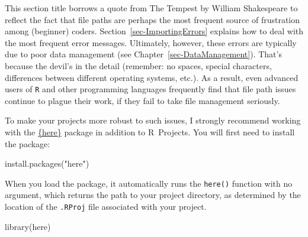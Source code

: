 \documentclass[
  letterpaper,
  DIV=11,
  numbers=noendperiod]{scrreprt}
\newenvironment{Shaded}{\begin{snugshade}}{\end{snugshade}}
\newcommand{\FunctionTok}[1]{\textcolor[rgb]{0.28,0.35,0.67}{#1}}
\newcommand{\NormalTok}[1]{\textcolor[rgb]{0.00,0.23,0.31}{#1}}
\newcommand{\StringTok}[1]{\textcolor[rgb]{0.13,0.47,0.30}{#1}}
\newcounter{quartocalloutnteno}
\newcommand{\quartocalloutnte}[1]{\refstepcounter{quartocalloutnteno}\label{#1}}
\begin{document}
\begin{tcolorbox}[enhanced jigsaw, arc=.35mm, bottomrule=.15mm, bottomtitle=1mm, breakable, colback=white, colbacktitle=quarto-callout-important-color!10!white, colframe=quarto-callout-important-color-frame, coltitle=black, left=2mm, leftrule=.75mm, opacityback=0, opacitybacktitle=0.6, rightrule=.15mm, title=\textcolor{quarto-callout-important-color}{\faExclamation}\hspace{0.5em}{Important \ref*{nte-here}: ``Hell is empty, and all the devils are here.''~\emoji{smiling-imp}}, titlerule=0mm, toprule=.15mm, toptitle=1mm]

\quartocalloutnte{nte-here} 

This section title borrows a quote from The Tempest by William
Shakespeare to reflect the fact that file paths are perhaps the most
frequent source of frustration among (beginner) coders.
Section~\ref{sec-ImportingErrors} explains how to deal with the most
frequent error messages. Ultimately, however, these errors are typically
due to poor data management (see Chapter~\ref{sec-DataManagement}).
That's because the devil's in the detail (remember: no spaces, special
characters, differences between different operating systems, etc.). As a
result, even advanced users of \texttt{R} and other programming
languages frequently find that file path issues continue to plague their
work, if they fail to take file management seriously.

To make your projects more robust to such issues, I strongly recommend
working with the \href{https://here.r-lib.org/}{\{here\}} package in
addition to R~Projects. You will first need to install the package:

\begin{Shaded}
\begin{Highlighting}[]
\FunctionTok{install.packages}\NormalTok{(}\StringTok{"here"}\NormalTok{)}
\end{Highlighting}
\end{Shaded}

When you load the package, it automatically runs the \texttt{here()}
function with no argument, which returns the path to your project
directory, as determined by the location of the \texttt{.RProj} file
associated with your project.

\begin{Shaded}
\begin{Highlighting}[]
\FunctionTok{library}\NormalTok{(here)}
\end{Highlighting}
\end{Shaded}


\end{tcolorbox}
\end{document}
